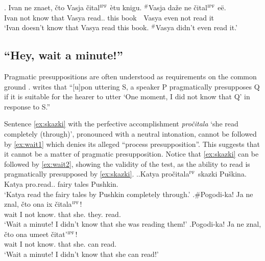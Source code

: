 \exg. \label{ex:discourse:test}Ivan ne znaet, \v{c}to Vasja \v{c}ital$^{\textsc{ipf}}$ \`{e}tu knigu. $^\#$Vasja da\v{z}e ne \v{c}ital$^{\textsc{ipf}}$ e\"{e}.\\
Ivan not know that Vasya read.. this book \textcolor{white}{$^\#$}Vasya even not read it\\
\trans `Ivan doesn't know that Vasya read this book. $^\#$Vasya didn't even read it.'


\subsection{``Hey, wait a minute!''}
Pragmatic presuppositions are often understood as requirements on the common ground \citep[see e.g.,][]{Karttunen:73, Stalnaker:73, Shanon:76, Heim:83}. \citet[][248]{Shanon:76} writes that ``[u]pon uttering S, a speaker P pragmatically presupposes Q if it is suitable for the hearer to utter `One moment, I did not know that Q' in response to S.''

Sentence \ref{ex:skazki} with the perfective accomplishment \textit{pro\v{c}itala} `she read completely (through)', pronounced with a neutral intonation, cannot be followed by \ref{ex:wait1} which denies its alleged ``process presupposition''. This suggests that it cannot be a matter of pragmatic presupposition. Notice that \ref{ex:skazki} can be followed by \ref{ex:wait2}, showing the validity of the test, as the ability to read is pragmatically presupposed by \ref{ex:skazki}.
\ex.\ag.\label{ex:skazki}Katya pro\v{c}itala$^{\textsc{pf}}$ skazki Pu\v{s}kina.\\
Katya pro.read.. {fairy tales} Pushkin.\\
\trans `Katya read the fairy tales by Pushkin completely through.'
\bg.\#Pogodi-ka! Ja ne znal, \v{c}to ona ix \v{c}itala$^{\textsc{ipf}}$!\label{ex:wait1}\\
wait I not know. that she. they. read.\\
\trans `Wait a minute! I didn't know that she was reading them!'
\bg.\label{ex:wait2}Pogodi-ka! Ja ne znal, \v{c}to ona umeet \v{c}itat'$^{\textsc{ipf}}$!\\
wait I not know. that she. can read.\\
\trans `Wait a minute! I didn't know that she can read!'


